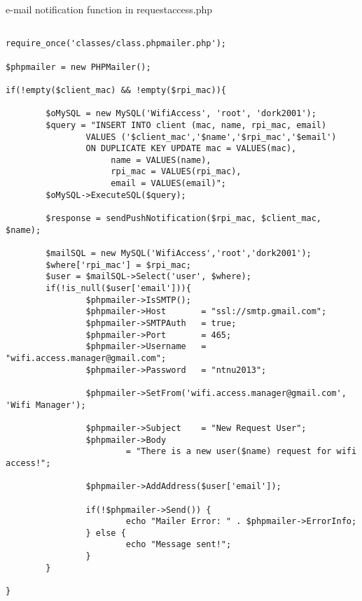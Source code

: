 \begin{algorithm}[h]
  \caption{ e-mail notification function in requestaccess.php}
  \label{code:email_server}
  \begin{verbatim}
  
require_once('classes/class.phpmailer.php');

$phpmailer = new PHPMailer();

if(!empty($client_mac) && !empty($rpi_mac)){
        
        $oMySQL = new MySQL('WifiAccess', 'root', 'dork2001');
        $query = "INSERT INTO client (mac, name, rpi_mac, email) 
        		VALUES ('$client_mac','$name','$rpi_mac','$email') 
        		ON DUPLICATE KEY UPDATE mac = VALUES(mac),
        			 name = VALUES(name), 
        			 rpi_mac = VALUES(rpi_mac), 
        			 email = VALUES(email)";
        $oMySQL->ExecuteSQL($query);
        
        $response = sendPushNotification($rpi_mac, $client_mac, $name);

        $mailSQL = new MySQL('WifiAccess','root','dork2001');
        $where['rpi_mac'] = $rpi_mac;
        $user = $mailSQL->Select('user', $where);
        if(!is_null($user['email'])){
                $phpmailer->IsSMTP();
                $phpmailer->Host       = "ssl://smtp.gmail.com";
                $phpmailer->SMTPAuth   = true;
                $phpmailer->Port       = 465;
                $phpmailer->Username   = "wifi.access.manager@gmail.com";
                $phpmailer->Password   = "ntnu2013";

                $phpmailer->SetFrom('wifi.access.manager@gmail.com', 'Wifi Manager');

                $phpmailer->Subject    = "New Request User";
                $phpmailer->Body 
                		= "There is a new user($name) request for wifi access!";

                $phpmailer->AddAddress($user['email']);

                if(!$phpmailer->Send()) {
                        echo "Mailer Error: " . $phpmailer->ErrorInfo;
                } else {
                        echo "Message sent!";
                }
        }

}
 \end{verbatim}
\end{algorithm}